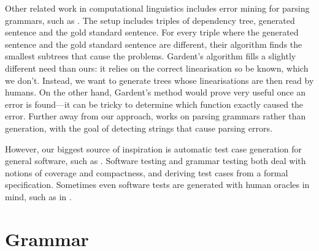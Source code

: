 Other related work in computational linguistics includes error mining
for parsing grammars, such as \citet{gardent2012errormining}. The
setup includes triples of dependency tree, generated sentence and the
gold standard sentence. For every triple where the generated sentence
and the gold standard sentence are different, their algorithm finds
the smallest subtrees that cause the problems. Gardent's algorithm
fills a slightly different need than ours: it relies on the correct
linearisation so be known, which we don't. Instead, we want to
generate trees whose linearisations are then read by humans. On the
other hand, Gardent's method would prove very useful once an error is
found---it can be tricky to determine which function exactly caused
the error.  Further away from our approach, \citet{vanNoord2004} works
on parsing grammars rather than generation, with the goal of detecting
strings that cause parsing errors.

However, our biggest source of inspiration is automatic test case
generation for general software, such as
\citet{celentano1980compiler,Geist1996,QuickCheck}. Software testing and
grammar testing both deal with notions of coverage and compactness,
and deriving test cases from a formal specification. Sometimes even
software tests are generated with human oracles in mind, such as in 
\citet{Matinnejad2016automated_testsuite_simulink}.


\section{Grammar}


